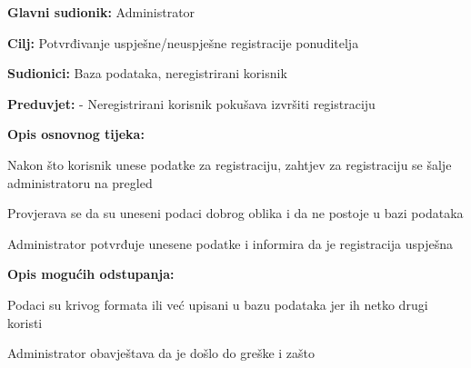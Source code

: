                     \noindent {}
					\begin{packed_item}
	
						\item \textbf{Glavni sudionik: } Administrator
						\item  \textbf{Cilj:} Potvrđivanje uspješne/neuspješne registracije ponuditelja
						\item  \textbf{Sudionici:} Baza podataka, neregistrirani korisnik
						\item  \textbf{Preduvjet:} - Neregistrirani korisnik pokušava izvršiti registraciju
						\item  \textbf{Opis osnovnog tijeka:}
						
						\item[] \begin{packed_enum}	
							\item Nakon što korisnik unese podatke za registraciju, zahtjev za registraciju se šalje administratoru na pregled
							\item Provjerava se da su uneseni podaci dobrog oblika i da ne postoje u bazi podataka
                           					\item Administrator potvrđuje unesene podatke i informira da je registracija uspješna
						\end{packed_enum}
						
						\item  \textbf{Opis mogućih odstupanja:}
						
						\item[] \begin{packed_item}
	
							\item[2.a] Podaci su krivog formata ili već upisani u bazu podataka jer ih netko drugi koristi
							\item[] \begin{packed_enum}			
								\item Administrator obavještava da je došlo do greške i zašto
							\end{packed_enum}
						\end{packed_item}
					\end{packed_item}

